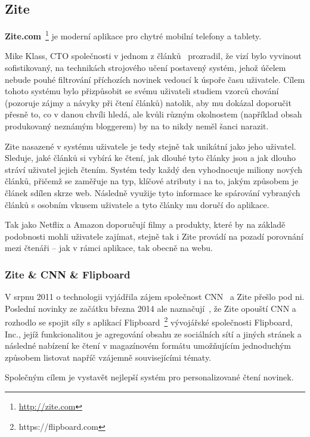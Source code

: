 \documentclass[thesis=M,czech]{FITthesis}[2014/05/07]
\begin{document}
\subsection{Zite}

\textbf{Zite.com}~\footnote{\url{http://zite.com}} je moderní aplikace pro chytré mobilní telefony a tablety.

Mike Klass, CTO společnosti v jednom z článků~\cite{ziteflip} prozradil, že vizí bylo vyvinout sofistikovaný, na technikách strojového učení postavený systém, jehož účelem nebude pouhé filtrování příchozích novinek vedoucí k úspoře času uživatele. Cílem tohoto systému bylo přizpůsobit se svému uživateli studiem vzorců chování (pozoruje zájmy a návyky při čtení článků) natolik, aby mu dokázal doporučit přesně to, co v danou chvíli hledá, ale kvůli různým okolnostem (například obsah produkovaný neznámým bloggerem) by na to nikdy neměl šanci narazit.

Zite nasazené v systému uživatele je tedy stejně tak unikátní jako jeho uživatel. Sleduje, jaké článků si vybírá ke čtení, jak dlouhé tyto články jsou a jak dlouho stráví uživatel jejich čtením. Systém tedy každý den vyhodnocuje miliony nových článků, přičemž se zaměřuje na typ, klíčové atributy i na to, jakým způsobem je článek sdílen skrze web. Následně využije tyto informace ke spárování vybraných článků s osobním vkusem uživatele a tyto články mu doručí do aplikace. 

Tak jako Netflix a Amazon doporučují filmy a produkty, které by na základě podobnosti mohli uživatele zajímat, stejně tak i Zite provádí na pozadí porovnání mezi čtenáři – jak v rámci aplikace, tak obecně na webu.

\subsubsection{Zite \& CNN \& Flipboard}
V srpnu 2011 o technologii vyjádřila zájem společnost CNN~\cite{zitecnn} a Zite přešlo pod ni. Poslední novinky ze začátku března 2014 ale naznačují~\cite{ziteflip}, že Zite opouští CNN a rozhodlo se spojit síly s aplikací Flipboard~\footnote{https://flipboard.com} vývojářské společnosti Flipboard, Inc., jejíž funkcionalitou je agregování obsahu ze sociálních sítí a jiných stránek a následné nabízení ke čtení v magazínovém formátu umožňujícím jednoduchým způsobem listovat napříč vzájemně souvisejícími tématy.

Společným cílem je vystavět nejlepší systém pro personalizované čtení novinek. 
\end{document}
